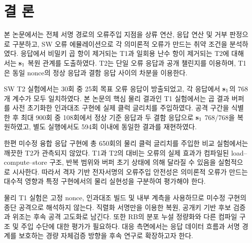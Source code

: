 \section{결 론}
\label{sec:conclusion}

본 논문에서는  전체 서명 경로의 오류주입 지점을
상류 연산, 응답 연산 및 거부 판정으로 구분하고, SW 오류
에뮬레이션으로 각 의미론적 오류가 만드는 취약 조건을 분석하였다.
응답에서 비밀키 곱 항이 제거되는 T1과 일회용 난수 항이 제거되는
T2에 대해서는 $\mathbf{s}_1$ 복원 관계를 도출하였다. T2는 단일 오류
응답과 공개 챌린지를 이용하며, T1은 동일 nonce의 정상 응답과
결함 응답 사이의 차분을 이용한다.

SW T2 실험에서는 30회 중 25회 목표 오류 응답이 방출되었고,
각 응답에서 $\mathbf{s}_1$의 768개 계수가 모두 일치하였다. 본 논문의
핵심 물리 결과인 T1 실험에서는 곱 결과 버퍼를 사전 초기화한
인과대조 구현에 실제 클럭 글리치를 주입하였다. 공격 구간을 식별한
후 최대 900회 중 108회에서 정상 기준 응답과 두 결함 응답으로
$\mathbf{s}_1$ 768/768을 복원하였고, 별도 실행에서도 594회 이내에
동일한 결과를 재현하였다.

한편 미수정 융합 응답 구현에 총 650회의 물리 클럭 글리치를 주입한
비교 실험에서는 깨끗한 T2가 관측되지 않았다. T1과 T2의 대비는
오류의 실제 효과가 컴파일된 load--compute--store 구조, 반복 범위와
버퍼 초기 상태에 의해 달라질 수 있음을 실험적으로 시사한다. 따라서
격자 기반 전자서명의 오류주입 안전성은 의미론적 오류가 만드는
대수적 영향과 특정 구현에서의 물리 실현성을 구분하여 평가해야 한다.

물리 T1 실험은 고정 nonce, 인과대조 빌드 및 내부 계측을 사용하므로
미수정 구현의 종단 공격으로 해석하지 않는다. 직렬화 서명만을 이용한
복원, 공개키 기반 후보 검증과 위조는 후속 공격 고도화로 남긴다.
또한 RB의 분포 누설 정량화와 다른 컴파일 구조 및 주입 수단에 대한
평가가 필요하다. 대응 측면에서는 응답 데이터 흐름과 서명 경계를
보호하는 경량 자체검증 방향을 후속 연구로 확장하고자 한다.
